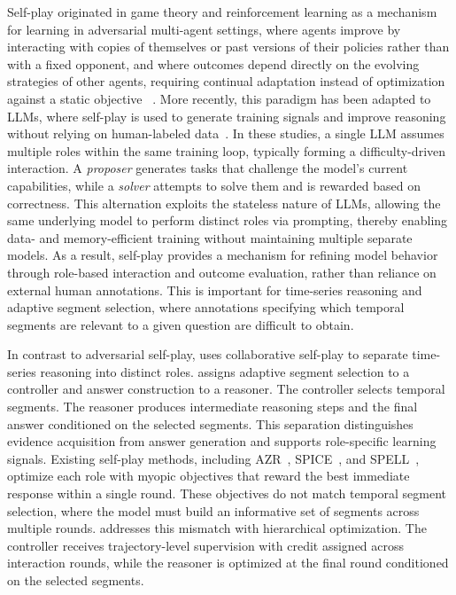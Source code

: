 Self-play originated in game theory and reinforcement learning as a mechanism for learning in adversarial multi-agent settings, where agents improve by interacting with copies of themselves or past versions of their policies rather than with a fixed opponent, and where outcomes depend directly on the evolving strategies of other agents, requiring continual adaptation instead of optimization against a static objective ~\cite{selfplay_survey}.
More recently, this paradigm has been adapted to LLMs, where self-play is used to generate training signals and improve reasoning without relying on human-labeled data~\cite{zhao2505absolute, fang2025serl,liu2025spice,yang2025spell, huang2025r, chen2025self, he2025visplay, wang2025vision, yu2025guided, yue2026dr, wang2026v}.  In these studies, a single LLM assumes multiple roles within the same training loop, typically forming a difficulty-driven interaction. A \emph{proposer} generates tasks that challenge the model’s current capabilities, while a \emph{solver} attempts to solve them and is rewarded based on correctness. This alternation exploits the stateless nature of LLMs, allowing the same underlying model to perform distinct roles via prompting, thereby enabling data- and memory-efficient training without maintaining multiple separate models. As a result, self-play provides a  mechanism for refining model behavior through role-based interaction and outcome evaluation, rather than reliance on external human annotations. 
This is important for time-series reasoning and adaptive segment selection, where annotations specifying which temporal segments are relevant to a given question are difficult to obtain. \vspace{0.3em}

In contrast to adversarial self-play, \algoname uses collaborative self-play to separate time-series reasoning into distinct roles. \algoname assigns adaptive segment selection to a controller and answer construction to a reasoner. The controller selects temporal segments. The reasoner produces intermediate reasoning steps and the final answer conditioned on the selected segments. This separation distinguishes evidence acquisition from answer generation and supports role-specific learning signals.
%
Existing self-play methods, including AZR~\cite{zhao2505absolute}, SPICE~\cite{liu2025spice}, and SPELL~\cite{yang2025spell}, optimize each role with myopic objectives that reward the best immediate response within a single round. These objectives do not match temporal segment selection, where the model must build an informative set of segments across multiple rounds. \algoname addresses this mismatch with hierarchical optimization. The controller receives trajectory-level supervision with credit assigned across interaction rounds, while the reasoner is optimized at the final round conditioned on the selected segments.
